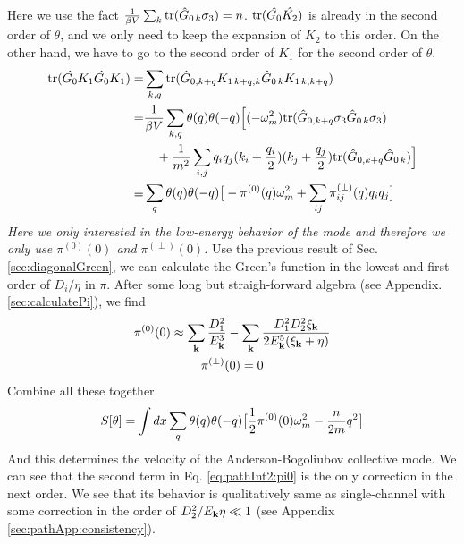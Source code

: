 Here we use the fact $\frac{1}{{\beta{}V}}\sum_{k}\text{tr}(\hat{G}_{0\,k}\sigma_3)=n$. $\text{tr}(\hat{G_{0}}\hat{K_2})$ is already in the second order of $\theta$, and we only need to keep the expansion of $K_2$ to this order. On the other hand, we have to go to the second order of $K_1$ for the second order of $\theta$. 
\begin{align}		
\text{tr}(\hat{G_{0}}{K_1}\hat{G_{0}}{K_1})=&\sum_{k,q}\text{tr}(\hat{G}_{0,k+q}K_{1\,k+q,k}\hat{G}_{0\,k}K_{1\,k,k+q})\\
=&\frac{1}{{\beta{}V}}\sum_{k,q}\theta(q)\theta(-q)\Big[(-\omega_m^2)\text{tr}(\hat{G}_{0,k+q}\sigma_3\hat{G}_{0\,k}\sigma_3)\nonumber\\
&\quad+\frac{1}{m^2}\sum_{i,j}q_iq_j(k_i+\frac{q_i}{2})(k_j+\frac{q_j}{2})\text{tr}(\hat{G}_{0,k+q}\hat{G}_{0\,k})\Big]\nonumber\\
\equiv&\sum_{q}\theta(q)\theta(-q)\big[-\pi^{(0)}(q)\omega_m^2+\sum_{ij}\pi^{(\perp)}_{ij}(q)q_iq_j\big]
\end{align}
\emph{Here we only interested in the low-energy behavior of the mode and therefore we only use $\pi^{(0)}(0)$ and $\pi^{(\perp)}(0)$.} Use the previous result of Sec. \ref{sec:diagonalGreen}, we can calculate the Green's function in the lowest and first order of $D_i/\eta$ in $\pi$.  After some long but straigh-forward algebra (see Appendix. \ref{sec:calculatePi}), we find
\begin{gather}
\pi^{(0)}(0)\approx\sum_{\mathbf{k}}\frac{D_{1}^{2}}{E_{\mathbf{k}}^{3}}-\sum_{\mathbf{k}}\frac{D_{1}^{2}D_{2}^{2}\xi_{\mathbf{k}}}{2E_{\mathbf{k}}^{5}(\xi_{\mathbf{k}}+\eta)}
\label{eq:pathInt2:pi0}\\
\pi^{(\perp)}(0)=0
\end{gather}
Combine all these together
\begin{equation}
S[\theta]=\int{dx}\sum_{q}\theta(q)\theta(-q)\big[\frac{1}{2}\pi^{(0)}(0)\omega_m^2-\frac{n}{2m}q^2\big]
\end{equation}
And this determines the velocity of the Anderson-Bogoliubov collective mode.  We can see that  the second term in Eq. \eqref{eq:pathInt2:pi0} is the only correction in the next order.  We see that its behavior is qualitatively same as  single-channel with some correction in the order of $D_{2}^2/E_{\mathbf{k}}\eta\ll1$ (see Appendix \ref{sec:pathApp:consistency}).


\begin{subappendices}

\end{subappendices}







